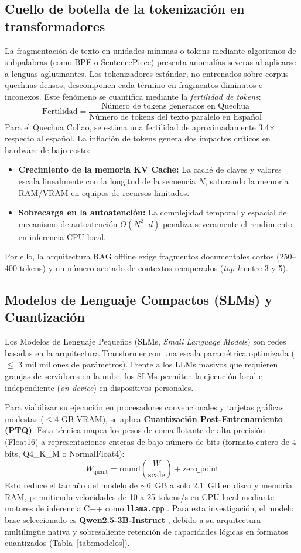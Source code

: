 \subsection{Cuello de botella de la tokenización en transformadores}
La fragmentación de texto en unidades mínimas o tokens mediante algoritmos de subpalabras (como BPE o SentencePiece) presenta anomalías severas al aplicarse a lenguas aglutinantes. Los tokenizadores estándar, no entrenados sobre corpus quechuas densos, descomponen cada término en fragmentos diminutos e inconexos. Este fenómeno se cuantifica mediante la \textit{fertilidad de tokens}:
$$\text{Fertilidad} = \frac{\text{Número de tokens generados en Quechua}}{\text{Número de tokens del texto paralelo en Español}}$$
Para el Quechua Collao, se estima una fertilidad de aproximadamente 3,4$\times$ respecto al español. La inflación de tokens genera dos impactos críticos en hardware de bajo costo:
\begin{itemize}
    \item \textbf{Crecimiento de la memoria KV Cache:} La caché de claves y valores escala linealmente con la longitud de la secuencia $N$, saturando la memoria RAM/VRAM en equipos de recursos limitados.
    \item \textbf{Sobrecarga en la autoatención:} La complejidad temporal y espacial del mecanismo de autoatención $O(N^2 \cdot d)$ penaliza severamente el rendimiento en inferencia CPU local.
\end{itemize}
Por ello, la arquitectura RAG offline exige fragmentos documentales cortos (250--400 tokens) y un número acotado de contextos recuperados (\textit{top-k} entre 3 y 5).

\subsection{Modelos de Lenguaje Compactos (SLMs) y Cuantización}
Los Modelos de Lenguaje Pequeños (SLMs, \textit{Small Language Models}) son redes basadas en la arquitectura Transformer \citep{Vaswani2017} con una escala paramétrica optimizada ($\le$ 3 mil millones de parámetros). Frente a los LLMs masivos que requieren granjas de servidores en la nube, los SLMs permiten la ejecución local e independiente (\textit{on-device}) en dispositivos personales.

Para viabilizar su ejecución en procesadores convencionales y tarjetas gráficas modestas ($\le 4$ GB VRAM), se aplica \textbf{Cuantización Post-Entrenamiento (PTQ)}. Esta técnica mapea los pesos de coma flotante de alta precisión (Float16) a representaciones enteras de bajo número de bits (formato entero de 4 bits, Q4\_K\_M o NormalFloat4):
$$W_{\text{quant}} = \text{round}\left( \frac{W}{\text{scale}} \right) + \text{zero\_point}$$
Esto reduce el tamaño del modelo de $\sim$6~GB a solo 2,1~GB en disco y memoria RAM, permitiendo velocidades de 10 a 25 tokens/s en CPU local mediante motores de inferencia C++ como \texttt{llama.cpp} \citep{Xu2024}. Para esta investigación, el modelo base seleccionado es \textbf{Qwen2.5-3B-Instruct} \citep{qwen2024}, debido a su arquitectura multilingüe nativa y sobresaliente retención de capacidades lógicas en formatos cuantizados (Tabla~\ref{tab:modelos}).

